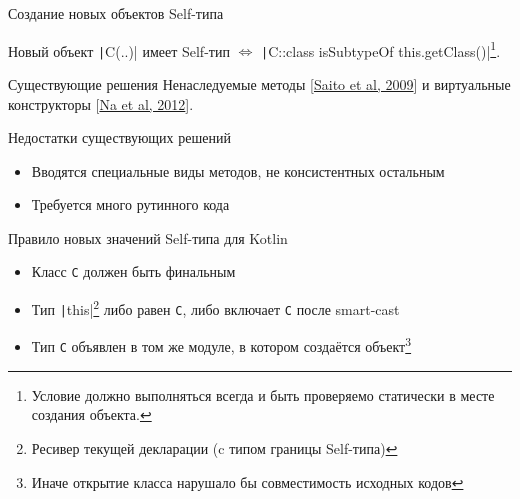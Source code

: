 \documentclass[aspectratio=169,usenames,dvipsnames]{beamer}
\begin{document}
    \begin{frame}[fragile]{Создание новых объектов Self-типа}


        Новый объект \texttt|C(..)| имеет Self-тип $\iff$ \texttt|C::class isSubtypeOf this.getClass()|\footnote{Условие должно выполняться всегда и быть проверяемо статически в месте создания объекта.}.

        \pause

        \begin{block}{Существующие решения}
            Ненаследуемые методы [\href{http://www.fos.kuis.kyoto-u.ac.jp/~igarashi/papers/pdf/thistype-SAC09.pdf}{Saito et al, 2009}] и виртуальные конструкторы [\href{https://www.researchgate.net/profile/Sukyoung-Ryu/publication/254004584_Exact_type_parameterization_and_ThisType_support/links/54b90ed10cf269d8cbf72d01/Exact-type-parameterization-and-ThisType-support.pdf}{Na et al, 2012}].
        \end{block}

        \begin{block}{Недостатки существующих решений}
            \begin{itemize}
                \item Вводятся специальные виды методов, не консистентных остальным
                \item Требуется много рутинного кода
            \end{itemize}
        \end{block}

        \pause

        \begin{block}{Правило новых значений Self-типа для Kotlin}
            \begin{itemize}
                \item Класс \texttt{C} должен быть финальным
                \item Тип \texttt|this|\footnote{Ресивер текущей декларации (c типом границы Self-типа)} либо равен \texttt{С}, либо включает \texttt{C} после smart-cast
                \item Тип \texttt{C} объявлен в том же модуле, в котором создаётся объект\footnote{Иначе открытие класса нарушало бы совместимость исходных кодов}
            \end{itemize}
        \end{block}
    \end{frame}
\end{document}
